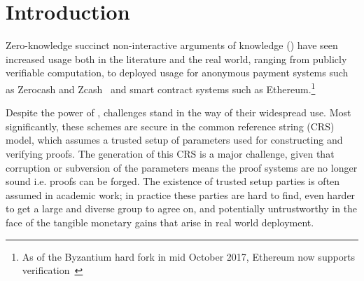 \documentclass{article}
\begin{document}
\begin{abstract}


\end{abstract}

\section{Introduction}
Zero-knowledge succinct non-interactive arguments of knowledge ({\snarks})\cite{Kil92,Mic00, Groth10,Lipmaa12,BitanskyCIOP12,GennaroGPR12,ParnoGHR13,BCGTV13,Lipmaa13,Groth16} have seen increased usage both in the literature and the real world, ranging from publicly verifiable computation, to deployed usage for anonymous payment systems such as Zerocash\cite{zerocash} and Zcash~\cite{Zcash} and smart contract systems such as Ethereum.\footnote{As of the Byzantium hard fork in mid October 2017, Ethereum now supports {\snark} verification~\cite{ethereumsnarks}}

Despite the power of {\snarks}, challenges stand in the way of their widespread use. %
 Most significantly, these schemes are secure in the common reference string (CRS) model, which assumes a trusted setup of parameters used for constructing and verifying proofs. The generation of this CRS is a major challenge, given that corruption or subversion of the parameters means the proof systems are no longer sound i.e. proofs can be forged. The existence of trusted setup parties is often assumed in academic work; in practice these parties are hard to find, even harder to get a large and diverse group to agree on, and potentially untrustworthy in the face of the tangible monetary gains that arise in real world deployment.
\end{document}
